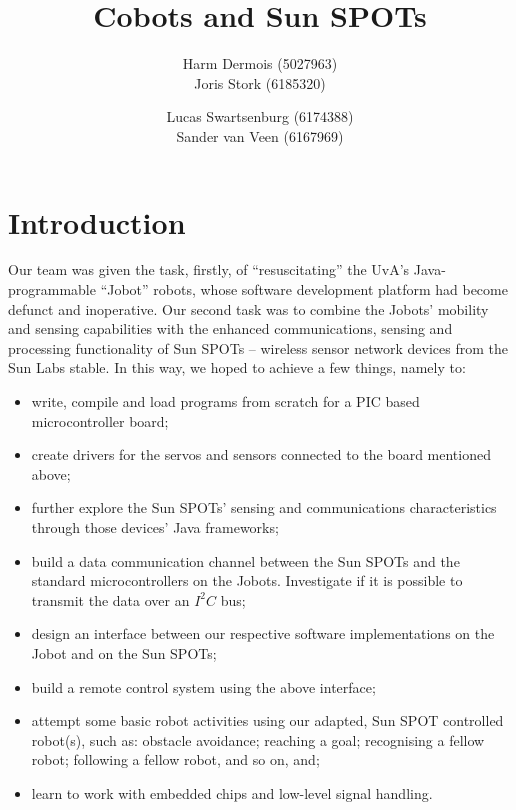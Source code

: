 \documentclass[a4paper,10pt]{article} %
\author{Harm Dermois (5027963) \\ Joris Stork (6185320) \and
Lucas Swartsenburg (6174388) \\ Sander van Veen (6167969)}
\title{Cobots and Sun SPOTs}
\begin{document}
\maketitle


\tableofcontents

\pagebreak

\section{Introduction} %

Our team was given the task, firstly, of ``resuscitating'' the UvA's
Java-programmable ``Jobot'' robots, whose software development platform had
become defunct and inoperative. Our second task was to combine the Jobots'
mobility and sensing capabilities with the enhanced communications, sensing and
processing functionality of Sun SPOTs -- wireless sensor network devices from the
Sun Labs stable. In this way, we hoped to achieve a few things, namely to:

\begin{itemize}
    \item write, compile and load programs from scratch for a PIC based
    microcontroller board;
    \item create drivers for the servos and sensors connected to the board
    mentioned above;
    \item further explore the Sun SPOTs' sensing and communications
    characteristics through those devices' Java frameworks;
    \item build a data communication channel between the Sun SPOTs and the
    standard microcontrollers on the Jobots. Investigate if it is possible
    to transmit the data over an $I^2C$ bus;
    \item design an interface between our respective software implementations on
    the Jobot and on the Sun SPOTs;
    \item build a remote control system using the above interface;
    \item attempt some basic robot activities using our adapted, Sun SPOT
    controlled robot(s), such as: obstacle avoidance; reaching a goal;
    recognising a fellow robot; following a fellow robot, and so on, and;
    \item learn to work with embedded chips and low-level signal handling.
\end{itemize}
\end{document}
